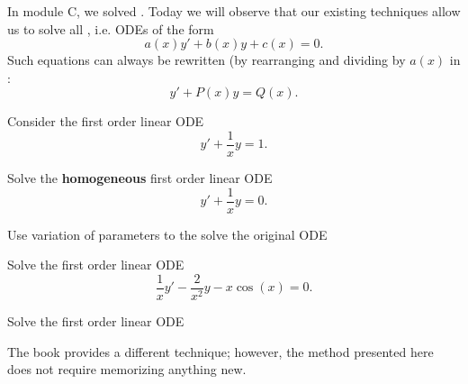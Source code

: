 \begin{applicationActivities}

\begin{observation}
In module C, we solved .
\vfill
Today we will observe that our existing techniques allow us to solve all , i.e. ODEs of the form
\[a(x)y'+b(x)y+c(x)=0.\]
Such equations can always be rewritten (by rearranging and dividing by \(a(x)\) in :
\[y'+P(x)y=Q(x).\]
\end{observation}

\begin{activity}{20}
Consider the first order linear ODE \[y'+\frac{1}{x}y=1.\]
\begin{subactivity}
Solve the \textbf{homogeneous} first order linear ODE \[y'+\frac{1}{x}y=0.\]
\end{subactivity}
\begin{subactivity}
Use variation of parameters to the solve the original ODE
\end{subactivity}
\end{activity}

\begin{activity}{15}
Solve the first order linear ODE \[\frac{1}{x}y'-\frac{2}{x^2}y-x\cos(x) = 0.\]
\end{activity}

\begin{activity}{15}
Solve the first order linear ODE
\end{activity}

\begin{remark}
The book provides a different technique; however, the method presented here does not require memorizing anything new.
\end{remark}



\end{applicationActivities}
